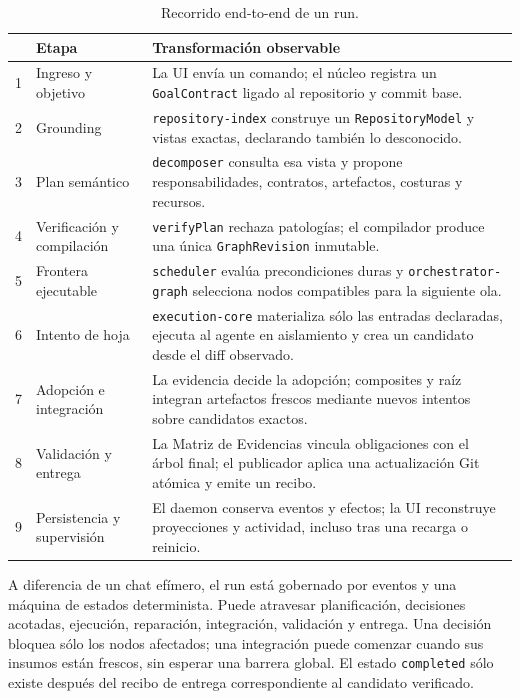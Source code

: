 \begin{table}[H]
  \centering
  \caption{Recorrido end-to-end de un run.}
  \label{tab:flujo-completo}
  \scriptsize
  \begin{tabularx}{\textwidth}{@{}p{0.55cm} p{3.0cm} X@{}}
    \toprule
    & \textbf{Etapa} & \textbf{Transformación observable} \\
    \midrule
    1 & Ingreso y objetivo & La UI envía un comando; el núcleo registra un \texttt{GoalContract} ligado al repositorio y commit base. \\
    2 & Grounding & \texttt{repository-index} construye un \texttt{RepositoryModel} y vistas exactas, declarando también lo desconocido. \\
    3 & Plan semántico & \texttt{decomposer} consulta esa vista y propone responsabilidades, contratos, artefactos, costuras y recursos. \\
    4 & Verificación y compilación & \texttt{verifyPlan} rechaza patologías; el compilador produce una única \texttt{GraphRevision} inmutable. \\
    5 & Frontera ejecutable & \texttt{scheduler} evalúa precondiciones duras y \texttt{orchestrator-graph} selecciona nodos compatibles para la siguiente ola. \\
    6 & Intento de hoja & \texttt{execution-core} materializa sólo las entradas declaradas, ejecuta al agente en aislamiento y crea un candidato desde el diff observado. \\
    7 & Adopción e integración & La evidencia decide la adopción; composites y raíz integran artefactos frescos mediante nuevos intentos sobre candidatos exactos. \\
    8 & Validación y entrega & La Matriz de Evidencias vincula obligaciones con el árbol final; el publicador aplica una actualización Git atómica y emite un recibo. \\
    9 & Persistencia y supervisión & El daemon conserva eventos y efectos; la UI reconstruye proyecciones y actividad, incluso tras una recarga o reinicio. \\
    \bottomrule
  \end{tabularx}
\end{table}

A diferencia de un chat efímero, el run está gobernado por eventos y una máquina
de estados determinista. Puede atravesar planificación, decisiones acotadas,
ejecución, reparación, integración, validación y entrega. Una decisión bloquea
sólo los nodos afectados; una integración puede comenzar cuando sus insumos
están frescos, sin esperar una barrera global. El estado \texttt{completed}
sólo existe después del recibo de entrega correspondiente al candidato
verificado.

